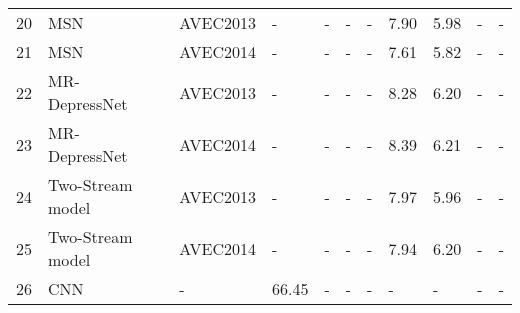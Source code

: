 \begin{table*}
\begin{tabular}{l|l|l|llll|ll|ll}
20                                      & MSN~\cite{ 2020A}                                                                                              & AVEC2013                                     & -        & -          & -         & -      & 7.90                     & 5.98                    & -         & -                  \\
21                                      & MSN~\cite{ 2020A}                                                                                              & AVEC2014                                     & -        & -          & -         & -      & 7.61                     & 5.82                    & -         & -                  \\
22                                      & MR-DepressNet~\cite{2020Visually}                                                                              & AVEC2013                                     & -        & -          & -         & -      & 8.28                     & 6.20                    & -         & -                  \\
23                                      & MR-DepressNet~\cite{2020Visually}                                                                              & AVEC2014                                     & -        & -          & -         & -      & 8.39                     & 6.21                    & -         & -                  \\
24                                      & Two-Stream model~\cite{2020Encoding}                                                                           & AVEC2013                                     & -        & -          & -         & -      & 7.97                     & 5.96                    & -         & -                  \\
25                                      & Two-Stream model~\cite{2020Encoding}                                                                           & AVEC2014                                     & -        & -          & -         & -      & 7.94                     & 6.20                    & -         & -                  \\
26                                      & CNN~\cite{2020Automatic}                                                                                       & -                                            & 66.45    & -          & -         & -      & -                        & -                       & -         & -                  \\

\end{tabular}
\end{table*}
